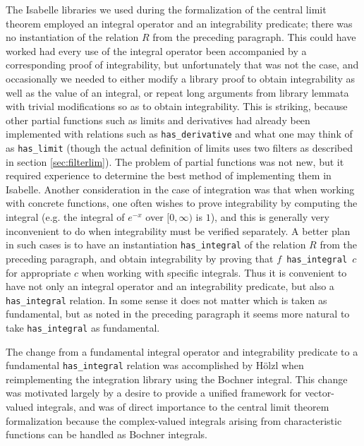 \documentclass[leqno]{article}
\theoremstyle{definition}
\begin{document}
The Isabelle libraries we used during the formalization of the central limit theorem employed an integral operator and an integrability predicate; there was no instantiation of the relation $R$ from the preceding paragraph. This could have worked had every use of the integral operator been accompanied by a corresponding proof of integrability, but unfortunately that was not the case, and occasionally we needed to either modify a library proof to obtain integrability as well as the value of an integral, or repeat long arguments from library lemmata with trivial modifications so as to obtain integrability. This is striking, because other partial functions such as limits and derivatives had already been implemented with relations such as \texttt{has\_derivative} and what one may think of as \texttt{has\_limit} (though the actual definition of limits uses two filters as described in section \ref{sec:filterlim}). The problem of partial functions was not new, but it required experience to determine the best method of implementing them in Isabelle. Another consideration in the case of integration was that when working with concrete functions, one often wishes to prove integrability by computing the integral (e.g. the integral of $e^{-x}$ over $[0, \infty)$ is $1$), and this is generally very inconvenient to do when integrability must be verified separately. A better plan in such cases is to have an instantiation \texttt{has\_integral} of the relation $R$ from the preceding paragraph, and obtain integrability by proving that \texttt{$f$ has\_integral $c$} for appropriate $c$ when working with specific integrals. Thus it is convenient to have not only an integral operator and an integrability predicate, but also a \texttt{has\_integral} relation. In some sense it does not matter which is taken as fundamental, but as noted in the preceding paragraph it seems more natural to take \texttt{has\_integral} as fundamental.

The change from a fundamental integral operator and integrability predicate to a fundamental \texttt{has\_integral} relation was accomplished by H\"olzl when reimplementing the integration library using the Bochner integral. This change was motivated largely by a desire to provide a unified framework for vector-valued integrals, and was of direct importance to the central limit theorem formalization because the complex-valued integrals arising from characteristic functions can be handled as Bochner integrals.
\end{document}
